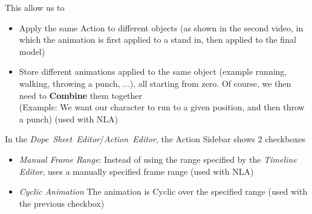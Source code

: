 \documentclass{article}
\begin{document}
This allow us to 
\begin{itemize}[noitemsep, topsep=0pt]
    \item Apply the same Action to different objects (as shown in the second video, in which the animation is first applied to a stand in, then applied to the final model)
    \item Store different animations applied to the same object (example running, walking, throwing a punch, ...), all starting from zero. Of course, we then need to \textbf{Combine} them together\\
    (Example: We want our character to run to a given position, and then throw a punch) (used with NLA)
\end{itemize}
In the \mbox{\textit{Dope Sheet Editor}/\textit{Action Editor}}, the Action Sidebar shows 2 checkboxes
\begin{itemize}[noitemsep, topsep=0pt]
    \item \textit{Manual Frame Range}: Instead of using the range specified by the \textit{Timeline Editor}, uses a manually specified frame range (used with NLA)
    \item \textit{Cyclic Animation} The animation is Cyclic over the specified range (used with the previous checkbox)
\end{itemize}
\end{document}
